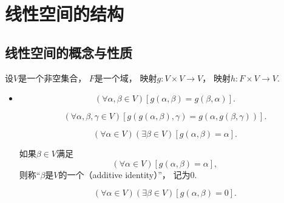 \section{线性空间的结构}
\subsection{线性空间的概念与性质}
\begin{definition}\label{definition:线性空间.线性空间的结构.线性空间的定义}
设\(V\)是一个非空集合，
\(F\)是一个域，
映射\(g\colon V \times V \to V\)，
映射\(h\colon F \times V \to V\).
\begingroup
\let\labelitemi\relax
\begin{itemize}
		\item
		\vspace{-1.2cm}
		\begin{axiom}[加法交换律]\label{definition:线性空间.运算法则1}
			\begin{equation*}
				(\forall\alpha,\beta\in V)
				[
					g(\alpha,\beta)
					= g(\beta,\alpha)
				].
			\end{equation*}
		\end{axiom}
		\begin{axiom}[加法结合律]\label{definition:线性空间.运算法则2}
			\begin{equation*}
				(\forall\alpha,\beta,\gamma\in V)
				[
					g(g(\alpha,\beta),\gamma)
					= g(\alpha,g(\beta,\gamma))
				].
			\end{equation*}
		\end{axiom}
		\begin{axiom}[零元的存在性]\label{definition:线性空间.运算法则3}
			\begin{equation*}
				(\forall \alpha \in V)
				(\exists \beta \in V)
				[
					g(\alpha,\beta)
					= \alpha
				].
			\end{equation*}

			如果\(\beta \in V\)满足\begin{equation*}
				(\forall \alpha \in V)
				[
					g(\alpha,\beta)
					= \alpha
				],
			\end{equation*}
			则称“\(\beta\)是\(V\)的一个（additive identity）”，
			记为\(0\).
		\end{axiom}
		\begin{axiom}[负元的存在性]\label{definition:线性空间.运算法则4}
			\begin{equation*}
				(\forall \alpha \in V)
				(\exists \beta \in V)
				[
					g(\alpha,\beta)
					= 0
				].
			\end{equation*}


\end{axiom}
\end{itemize}
\end{definition}
